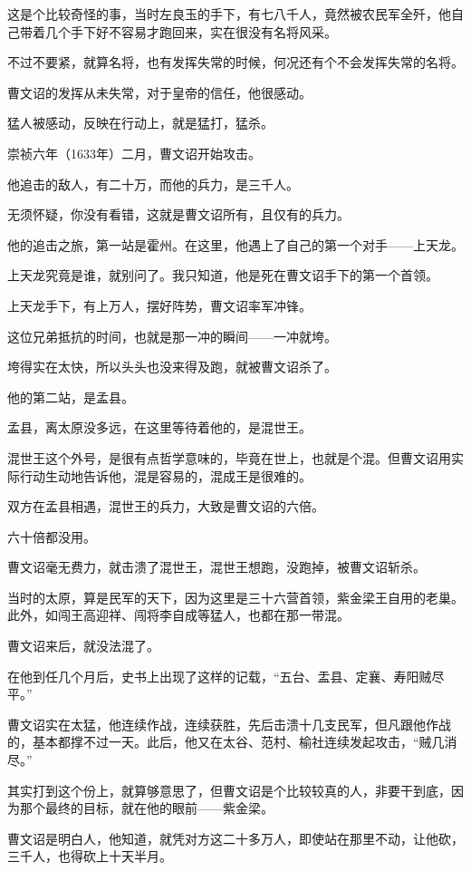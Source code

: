 \begin{multicols}{\theparacolNo}
		这是个比较奇怪的事，当时左良玉的手下，有七八千人，竟然被农民军全歼，他自己带着几个手下好不容易才跑回来，实在很没有名将风采。

		不过不要紧，就算名将，也有发挥失常的时候，何况还有个不会发挥失常的名将。

		曹文诏的发挥从未失常，对于皇帝的信任，他很感动。

		猛人被感动，反映在行动上，就是猛打，猛杀。

		崇祯六年（1633年）二月，曹文诏开始攻击。

		他追击的敌人，有二十万，而他的兵力，是三千人。

		无须怀疑，你没有看错，这就是曹文诏所有，且仅有的兵力。

		他的追击之旅，第一站是霍州。在这里，他遇上了自己的第一个对手——上天龙。

		上天龙究竟是谁，就别问了。我只知道，他是死在曹文诏手下的第一个首领。

		上天龙手下，有上万人，摆好阵势，曹文诏率军冲锋。

		这位兄弟抵抗的时间，也就是那一冲的瞬间——一冲就垮。

		垮得实在太快，所以头头也没来得及跑，就被曹文诏杀了。

		他的第二站，是孟县。

		孟县，离太原没多远，在这里等待着他的，是混世王。

		混世王这个外号，是很有点哲学意味的，毕竟在世上，也就是个混。但曹文诏用实际行动生动地告诉他，混是容易的，混成王是很难的。

		双方在孟县相遇，混世王的兵力，大致是曹文诏的六倍。

		六十倍都没用。

		曹文诏毫无费力，就击溃了混世王，混世王想跑，没跑掉，被曹文诏斩杀。

		当时的太原，算是民军的天下，因为这里是三十六营首领，紫金梁王自用的老巢。此外，如闯王高迎祥、闯将李自成等猛人，也都在那一带混。

		曹文诏来后，就没法混了。

		在他到任几个月后，史书上出现了这样的记载，“五台、盂县、定襄、寿阳贼尽平。”

		曹文诏实在太猛，他连续作战，连续获胜，先后击溃十几支民军，但凡跟他作战的，基本都撑不过一天。此后，他又在太谷、范村、榆社连续发起攻击，“贼几消尽。”

		其实打到这个份上，就算够意思了，但曹文诏是个比较较真的人，非要干到底，因为那个最终的目标，就在他的眼前——紫金梁。

		曹文诏是明白人，他知道，就凭对方这二十多万人，即使站在那里不动，让他砍，三千人，也得砍上十天半月。


\end{multicols}
